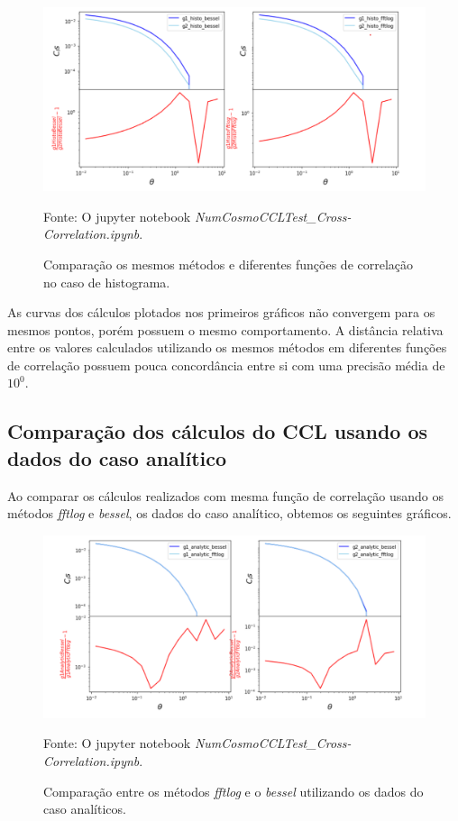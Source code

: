 \begin{figure}[H]
	\centering
	\caption{Comparação os mesmos métodos e diferentes funções de correlação no caso de histograma.}
	\label{fig:fig2}
	\includegraphics[width=0.7\linewidth]{figuras/fig2}
	
	Fonte: O jupyter notebook \textit{NumCosmoCCLTest\_Cross-Correlation.ipynb}.
\end{figure}

As curvas dos cálculos plotados nos primeiros gráficos não convergem para os mesmos pontos, porém possuem o mesmo comportamento. A distância relativa entre os valores calculados utilizando os mesmos métodos em diferentes funções de correlação possuem pouca concordância entre si com uma precisão média de $ 10^0 $.

\subsection*{Comparação dos cálculos do CCL usando os dados do caso analítico}

Ao comparar os cálculos realizados com mesma função de correlação usando os métodos \textit{fftlog} e \textit{bessel}, os dados do caso analítico, obtemos os seguintes gráficos. 

\begin{figure}[H]
	\centering
	\caption{Comparação entre os métodos \textit{fftlog} e o \textit{bessel} utilizando os dados do caso analíticos.}
	\label{fig:fig3}
	\includegraphics[width=0.7\linewidth]{figuras/fig3}
	
	Fonte: O jupyter notebook \textit{NumCosmoCCLTest\_Cross-Correlation.ipynb}.
\end{figure}

